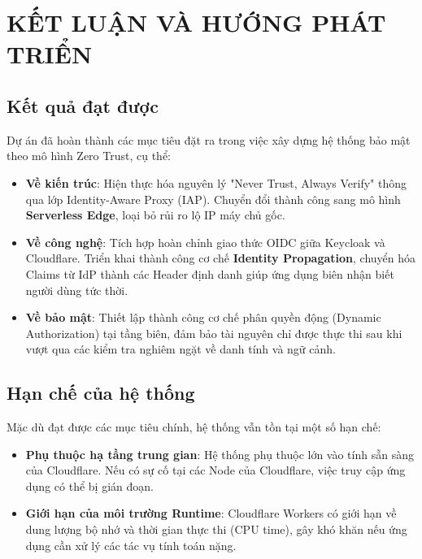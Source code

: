 
\section{KẾT LUẬN VÀ HƯỚNG PHÁT TRIỂN}

\subsection{Kết quả đạt được}
Dự án đã hoàn thành các mục tiêu đặt ra trong việc xây dựng hệ thống bảo mật theo mô hình Zero Trust, cụ thể:
\begin{itemize}
\item \textbf{Về kiến trúc}: Hiện thực hóa nguyên lý "Never Trust, Always Verify" thông qua lớp Identity-Aware Proxy (IAP). Chuyển đổi thành công sang mô hình \textbf{Serverless Edge}, loại bỏ rủi ro lộ IP máy chủ gốc.
\item \textbf{Về công nghệ}: Tích hợp hoàn chỉnh giao thức OIDC giữa Keycloak và Cloudflare. Triển khai thành công cơ chế \textbf{Identity Propagation}, chuyển hóa Claims từ IdP thành các Header định danh giúp ứng dụng biên nhận biết người dùng tức thời.
\item \textbf{Về bảo mật}: Thiết lập thành công cơ chế phân quyền động (Dynamic Authorization) tại tầng biên, đảm bảo tài nguyên chỉ được thực thi sau khi vượt qua các kiểm tra nghiêm ngặt về danh tính và ngữ cảnh.
\end{itemize}

\subsection{Hạn chế của hệ thống}
Mặc dù đạt được các mục tiêu chính, hệ thống vẫn tồn tại một số hạn chế:
\begin{itemize}
\item \textbf{Phụ thuộc hạ tầng trung gian}: Hệ thống phụ thuộc lớn vào tính sẵn sàng của Cloudflare. Nếu có sự cố tại các Node của Cloudflare, việc truy cập ứng dụng có thể bị gián đoạn.
\item \textbf{Giới hạn của môi trường Runtime}: Cloudflare Workers có giới hạn về dung lượng bộ nhớ và thời gian thực thi (CPU time), gây khó khăn nếu ứng dụng cần xử lý các tác vụ tính toán nặng.
\end{itemize}

